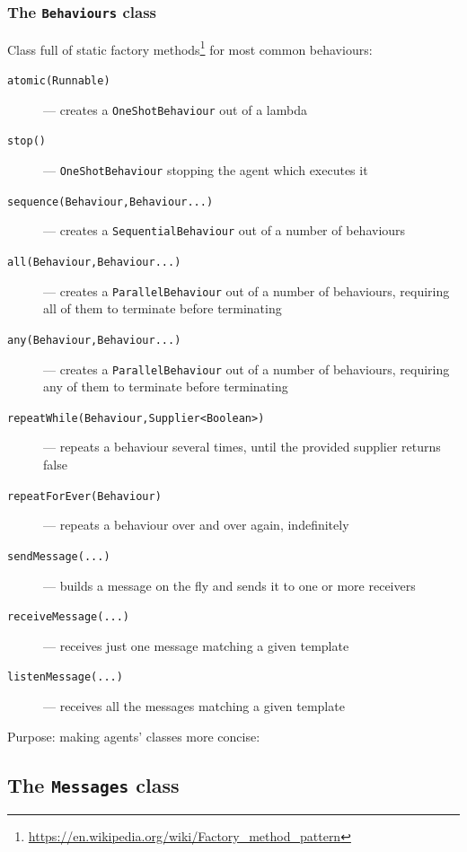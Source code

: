 \documentclass{beamer}\mode<presentation>{\usetheme{AMSCesenaPurpleAndGold}}
\begin{document}
\begin{frame}[allowframebreaks]\frametitle{The \texttt{Behaviour\textbf{s}} class}
    Class full of \alert{static factory methods}\footnote{\url{https://en.wikipedia.org/wiki/Factory_method_pattern}} for most common behaviours:
    \begin{description}
        \item[\texttt{atomic(Runnable)}] --- creates a \texttt{OneShotBehaviour} out of a lambda
        \item[\texttt{stop()}] --- \texttt{OneShotBehaviour} stopping the agent which executes it
        \item[\texttt{sequence(Behaviour,Behaviour...)}] --- creates a \texttt{SequentialBehaviour} out of a number of behaviours
        \item[\texttt{all(Behaviour,Behaviour...)}] --- creates a \texttt{ParallelBehaviour} out of a number of behaviours, requiring \alert{all} of them to terminate before terminating
        \item[\texttt{any(Behaviour,Behaviour...)}] --- creates a \texttt{ParallelBehaviour} out of a number of behaviours, requiring \alert{any} of them to terminate before terminating
        \item[\texttt{repeatWhile(Behaviour,Supplier<Boolean>)}] --- repeats a behaviour several times, until the provided supplier returns false
        \item[\texttt{repeatForEver(Behaviour)}] --- repeats a behaviour over and over again, indefinitely
        \item[\texttt{sendMessage(...)}] --- builds a message on the fly and sends it to one or more receivers
        \item[\texttt{receiveMessage(...)}] --- receives \alert{just one message} matching a given template
        \item[\texttt{listenMessage(...)}] --- receives \alert{all the messages} matching a given template
    \end{description}

    \framebreak

    Purpose: making agents' classes more concise:
    

\end{frame}

\subsection{The \texttt{Messages} class}
\end{document}
